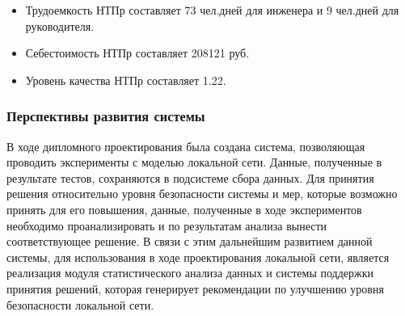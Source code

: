     \begin{itemize}
        \item Трудоемкость НТПр составляет 73 чел.дней для инженера и 9 чел.дней для руководителя.
        \item Себестоимость НТПр составляет 208121 руб.
        \item Уровень качества НТПр составляет 1.22.
    \end{itemize}

    \subsubsection{Перспективы развития системы}
    
    В ходе дипломного проектирования была создана система, позволяющая проводить эксперименты с моделью локальной сети. Данные, полученные в результате тестов, сохраняются в подсистеме сбора данных. Для принятия решения относительно уровня безопасности системы и мер, которые возможно принять для его повышения, данные, полученные в ходе экспериментов необходимо проанализировать и по результатам анализа вынести соответствующее решение. В связи с этим дальнейшим развитием данной системы, для использования в ходе проектирования локальной сети, является реализация модуля статистического анализа данных и системы поддержки принятия решений, которая генерирует рекомендации по улучшению уровня безопасности локальной сети.
